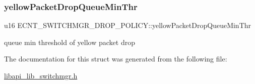 \subsubsection{\texorpdfstring{yellow\+Packet\+Drop\+Queue\+Min\+Thr}{yellowPacketDropQueueMinThr}}
{\footnotesize\ttfamily u16 E\+C\+N\+T\+\_\+\+S\+W\+I\+T\+C\+H\+M\+G\+R\+\_\+\+D\+R\+O\+P\+\_\+\+P\+O\+L\+I\+C\+Y\+::yellow\+Packet\+Drop\+Queue\+Min\+Thr}

queue min threshold of yellow packet drop 

The documentation for this struct was generated from the following file\+:\begin{DoxyCompactItemize}
\item 
\hyperlink{libapi__lib__switchmgr_8h}{libapi\+\_\+lib\+\_\+switchmgr.\+h}\end{DoxyCompactItemize}
